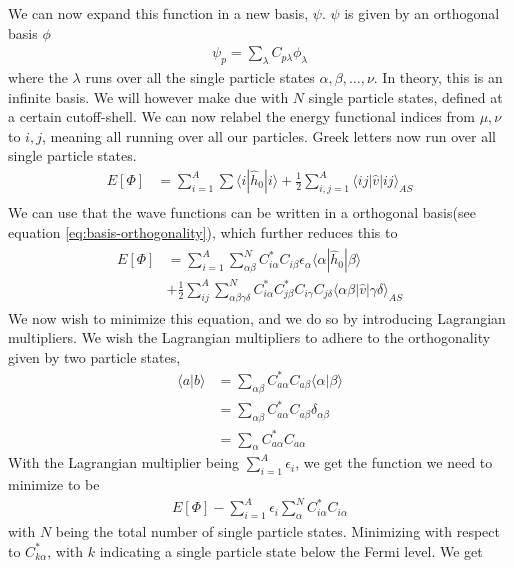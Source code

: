 \documentclass[11pt]{article}
\begin{document}
We can now expand this function in a new basis, $\psi$. $\psi$ is given by an orthogonal basis $\phi$
\begin{align}
	\psi_p = \sum_\lambda C_{p\lambda} \phi_\lambda
	\label{eq:basis-orthogonality}
\end{align}
where the $\lambda$ runs over all the single particle states $\alpha, \beta, \dots, \nu$. In theory, this is an infinite basis. We will however make due with $N$ single particle states, defined at a certain cutoff-shell. We can now relabel the energy functional indices from $\mu,\nu$ to $i,j$, meaning all running over all our particles. Greek letters now run over all single particle states.
\begin{align*}
	E[\Phi] &= \sum^A_{i=1} \sum \langle i |\hat{h}_0| i \rangle + \frac{1}{2}\sum^A_{i,j=1} \langle ij |\hat{v}| ij \rangle_{AS} \\
\end{align*}
We can use that the wave functions can be written in a orthogonal basis(see equation \eqref{eq:basis-orthogonality}), which further reduces this to
\begin{align}
	\begin{split}
		E[\Phi] &= \sum^A_{i=1} \sum^N_{\alpha\beta} C^*_{i\alpha} C_{i\beta} \epsilon_\alpha \langle\alpha|\hat{h}_0|\beta\rangle \\&+ \frac{1}{2}\sum^A_{ij}\sum^N_{\alpha\beta\gamma\delta} C^*_{i\alpha}C^*_{j\beta}C_{i\gamma}C_{j\delta} \langle \alpha\beta|\hat{v}|\gamma\delta\rangle_{AS}
		\label{eq:energy-functioinal-basis}
	\end{split}
\end{align}
We now wish to minimize this equation, and we do so by introducing Lagrangian multipliers. We wish the Lagrangian multipliers to adhere to the orthogonality given by two particle states,
\begin{align*}
	\langle a | b \rangle &= \sum_{\alpha\beta}C_{a\alpha}^*C_{a\beta}\langle \alpha | \beta \rangle \\&= \sum_{\alpha\beta}C_{a\alpha}^*C_{a\beta}\delta_{\alpha\beta} 
	\\&= \sum_{\alpha}C_{a\alpha}^*C_{a\alpha}
\end{align*}
With the Lagrangian multiplier being $\sum_{i=1}^A \epsilon_i$, we get the function we need to minimize to be
\begin{align*}
	E[\Phi] - \sum_{i=1}^A \epsilon_i \sum_{\alpha}^N C_{i\alpha}^*C_{i\alpha}
\end{align*}
with $N$ being the total number of single particle states. Minimizing with respect to $C^*_{k\alpha}$, with $k$ indicating a single particle state below the Fermi level. We get
\end{document}
